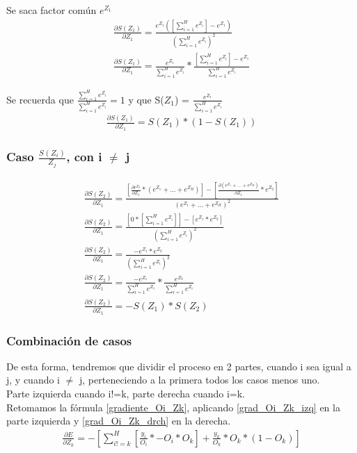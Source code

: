 Se saca factor común $e^{Z_1}$ \\
\begin{gather}
	\frac{\partial S(Z_1)}{\partial Z_1} = \frac{e^{Z_1} ([\sum_{i=1}^{H}  e^{Z_i}] - e^{Z_1})  }{(\sum_{i=1}^{H}  e^{Z_i})^2} \\
	\frac{\partial S(Z_1)}{\partial Z_1} = \frac{e^{Z_1}}{\sum_{i=1}^{H}  e^{Z_i}} * \frac{[\sum_{i=1}^{H}  e^{Z_i}] - e^{Z_1}}{\sum_{i=1}^{H}  e^{Z_i}}
\end{gather}

Se recuerda que $\frac{\sum_{i=1}^{H}  e^{Z_i}}{\sum_{i=1}^{H}  e^{Z_i}} = 1$ y que S($Z_1$) = $ \frac{e^{Z_1}}{\sum_{i=1}^{H}  e^{Z_i}}$ \\
\begin{gather}
	\frac{\partial S(Z_1)}{\partial Z_1} = S(Z_1) * (1- S(Z_1))
	\label{grad_Oi_Zk_drch}
\end{gather}

\subsubsection{Caso $\frac{S(Z_i)}{Z_j}$, con i $\neq$ j}

\begin{gather}
	\frac{\partial S(Z_2)}{\partial Z_1} = \frac{[\frac{\partial e^{Z_2}}{\partial Z_1} * (e^{Z_1} + ... + e^{Z_H}) ] - [\frac{\partial (e^{Z_1} + ... + e^{Z_H})}{\partial Z_1} * e^{Z_2} ] }{(e^{Z_1} + ... + e^{Z_H})^2} \\
	\frac{\partial S(Z_2)}{\partial Z_1} = \frac{[0 * [\sum_{i=1}^{H}  e^{Z_i}]] - [e^{Z_1} * e^{Z_2}]   }{ (\sum_{i=1}^{H}  e^{Z_i})^2} \\
	\frac{\partial S(Z_2)}{\partial Z_1} = \frac{-e^{Z_1} * e^{Z_2}  }{(\sum_{i=1}^{H}  e^{Z_i})^2} \\
	\frac{\partial S(Z_2)}{\partial Z_1} = \frac{-e^{Z_1}}{\sum_{i=1}^{H}  e^{Z_i}} * \frac{e^{Z_2}}{\sum_{i=1}^{H}  e^{Z_i}} \\
	\frac{\partial S(Z_2)}{\partial Z_1} = -S(Z_1) * S(Z_2)
	\label{grad_Oi_Zk_izq}
\end{gather}

\subsubsection{Combinación de casos}

De esta forma, tendremos que dividir  el proceso en 2 partes, cuando i sea igual a j, y cuando i $\neq$ j, perteneciendo a la primera todos los casos menos uno. \\
Parte izquierda cuando i!=k, parte derecha cuando i=k. \\
Retomamos la fórmula \ref{gradiente_Oi_Zk}, aplicando \ref{grad_Oi_Zk_izq} en la parte izquierda y \ref{grad_Oi_Zk_drch} en la derecha. \\
\begin{gather}
	\frac{\partial E}{\partial Z_k} = - [\sum_{i!=k}^{H} [\frac{y_i}{O_i} * -O_i * O_k ] + \frac{y_k}{O_k} * O_k * (1 - O_k)  ]
\end{gather}

